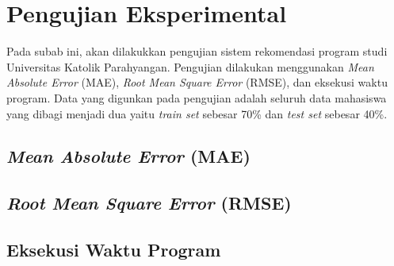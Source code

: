 \section{Pengujian Eksperimental}
\label{sec:pengujian eksperimental}

Pada subab ini, akan dilakukkan pengujian sistem rekomendasi program studi Universitas Katolik Parahyangan. Pengujian dilakukan menggunakan \textit{Mean Absolute Error} (MAE), \textit{Root Mean Square Error} (RMSE), dan eksekusi waktu program. Data yang digunkan pada pengujian adalah seluruh data mahasiswa yang dibagi menjadi dua yaitu \textit{train set} sebesar 70\% dan \textit{test set} sebesar 40\%.

\subsection{\textit{Mean Absolute Error} (MAE)}
\label{subsec:mae}

\subsection{\textit{Root Mean Square Error} (RMSE)}
\label{subsec:rmse}

\subsection{Eksekusi Waktu Program}
\label{subsec:eksekusi waktu program}